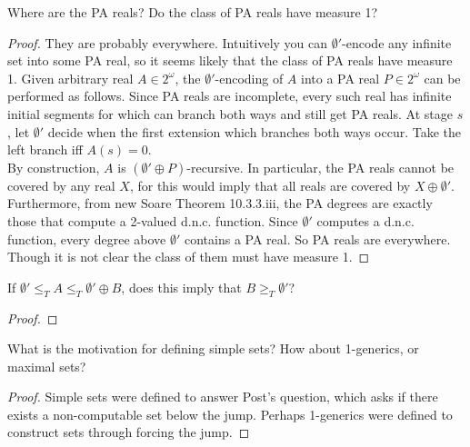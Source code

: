 \begin{question}
  Where are the PA reals? Do the class of PA reals have measure 1?
\end{question}
\begin{proof}
  They are probably everywhere. Intuitively you can $\emptyset'$-encode
  any infinite set into some PA real, so it seems likely that the class
  of PA reals have measure 1. Given arbitrary real $A\in2^\omega$, the
  $\emptyset'$-encoding of $A$ into a PA real $P\in2^\omega$ can be
  performed as follows. Since PA reals are incomplete, every such real
  has infinite initial segments for which can branch both ways and
  still get PA reals. At stage $s$, let $\emptyset'$ decide when the
  first extension which branches both ways occur. Take the left branch
  iff $A(s)=0$. \\

  By construction, $A$ is $(\emptyset'\oplus P)$-recursive. In
  particular, the PA reals cannot be covered by any real $X$, for this
  would imply that all reals are covered by $X\oplus\emptyset'$.\\

  Furthermore, from new Soare Theorem 10.3.3.iii, the PA degrees are
  exactly those that compute a 2-valued d.n.c. function. Since
  $\emptyset'$ computes a d.n.c. function, every degree above
  $\emptyset'$ contains a PA real. So PA reals are everywhere. Though
  it is not clear the class of them must have measure 1.
\end{proof}

\begin{question}
  If $\emptyset' \leq_T A\leq_T \emptyset'\oplus B$, does this imply
  that $B\geq_T\emptyset'$?
\end{question}
\begin{proof}
\end{proof}

\begin{question}
  What is the motivation for defining simple sets? How about
  1-generics, or maximal sets?
\end{question}
\begin{proof}
  Simple sets were defined to answer Post's question, which asks if
  there exists a non-computable set below the jump. Perhaps 1-generics
  were defined to construct sets through forcing the jump.
\end{proof}

